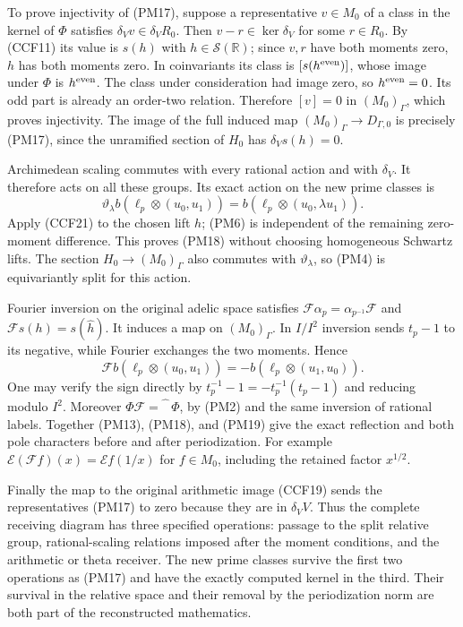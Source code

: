 To prove injectivity of (PM17), suppose a representative
$v\in M_0$ of a class in the kernel of $\Phi$ satisfies
$\delta_Vv\in\delta_VR_0$. Then $v-r\in\ker\delta_V$ for
some $r\in R_0$. By (CCF11) its value is $s(h)$ with
$h\in\mathcal S(\mathbb R)$; since $v,r$ have both moments
zero, $h$ has both moments zero. In coinvariants its class
is $[s(h^{\rm even})]$, whose image under $\Phi$ is
$h^{\rm even}$. The class under consideration had image
zero, so $h^{\rm even}=0$. Its odd part is already an
order-two relation. Therefore $[v]=0$ in $(M_0)_\Gamma$,
which proves injectivity. The image of the full induced map
$(M_0)_\Gamma\to D_{\Gamma,0}$ is precisely (PM17), since
the unramified section of $H_0$ has $\delta_Vs(h)=0$.

Archimedean scaling commutes with every rational action and
with $\delta_V$. It therefore acts on all these groups.
Its exact action on the new prime classes is
\[
 \vartheta_\lambda b(\ell_p\otimes(u_0,u_1))
      =b(\ell_p\otimes(u_0,\lambda u_1)).
 \tag{PM18}
\]
Apply (CCF21) to the chosen lift $h$; (PM6) is independent of
the remaining zero-moment difference. This proves (PM18)
without choosing homogeneous Schwartz lifts. The section
$H_0\to(M_0)_\Gamma$ also commutes with $\vartheta_\lambda$,
so (PM4) is equivariantly split for this action.

Fourier inversion on the original adelic space satisfies
$\mathcal F\alpha_p=\alpha_{p^{-1}}\mathcal F$ and
$\mathcal Fs(h)=s(\widehat h)$. It induces a map on
$(M_0)_\Gamma$. In $I/I^2$ inversion sends $t_p-1$ to its
negative, while Fourier exchanges the two moments. Hence
\[
 \mathcal F b(\ell_p\otimes(u_0,u_1))
       =-b(\ell_p\otimes(u_1,u_0)).
 \tag{PM19}
\]
One may verify the sign directly by
$t_p^{-1}-1=-t_p^{-1}(t_p-1)$ and reducing modulo $I^2$.
Moreover $\Phi\mathcal F=\widehat{\phantom h}\,\Phi$,
by (PM2) and the same inversion of rational labels.
Together (PM13), (PM18), and (PM19) give the exact reflection
and both pole characters before and after periodization.
For example
$\mathcal E(\mathcal F f)(x)=\mathcal E f(1/x)$
for $f\in M_0$, including the retained factor $x^{1/2}$.

Finally the map to the original arithmetic image (CCF19)
sends the representatives (PM17) to zero because they are
in $\delta_VV$. Thus the complete receiving diagram has
three specified operations: passage to the split relative
group, rational-scaling relations imposed after the moment
conditions, and the arithmetic or theta receiver. The new
prime classes survive the first two operations as (PM17)
and have the exactly computed kernel in the third. Their
survival in the relative space and their removal by the
periodization norm are both part of the reconstructed
mathematics.

